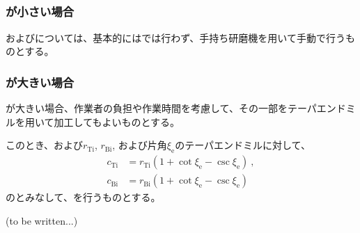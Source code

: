 \subsection{\EndFaceInRChamferMilling}

\subsubsection{\EndFaceInRChamferRadius が小さい場合}
\TopEndFaceInRChamferMilling および\BottomEndFaceInRChamferMilling については、基本的には\MMC では行わず、手持ち研磨機を用いて手動で行うものとする。

\subsubsection{\EndFaceInRChamferRadius が大きい場合}
\EndFaceInRChamferRadius が大きい場合、作業者の負担や作業時間を考慮して、その一部をテーパエンドミルを用いて加工してもよいものとする。

このとき、\TopEndFaceInRChamferRadius および\BottomFaceInRChamferRadius$r_\mathrm{Ti}$, $r_\mathrm{Bi}$, および片角$\xi_\mathrm e$のテーパエンドミルに対して、
\begin{align*}
  c_\mathrm{Ti} &= r_\mathrm{Ti}\left(1+\cot\xi_\mathrm e-\csc\xi_\mathrm e\right)\ ,\\
  c_\mathrm{Bi} &= r_\mathrm{Bi}\left(1+\cot\xi_\mathrm e-\csc\xi_\mathrm e\right)
\end{align*}
の\EndFaceCChamferLength とみなして、\EndFaceInCChamferMilling を行うものとする。



\clearpage
(to be written...)


\clearpage


